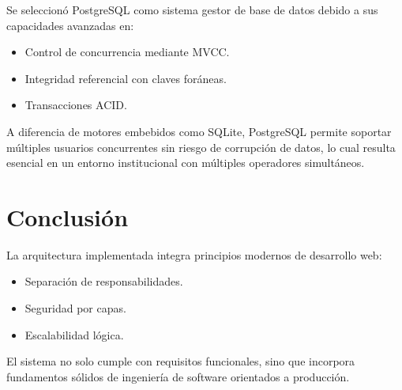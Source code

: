 \documentclass[12pt,letterpaper]{article}
\begin{document}
Se seleccionó PostgreSQL como sistema gestor de base de datos debido a sus capacidades avanzadas en:
\begin{itemize}
    \item Control de concurrencia mediante MVCC.
    \item Integridad referencial con claves foráneas.
    \item Transacciones ACID.
\end{itemize}

A diferencia de motores embebidos como SQLite, PostgreSQL permite soportar múltiples usuarios concurrentes sin riesgo de corrupción de datos, lo cual resulta esencial en un entorno institucional con múltiples operadores simultáneos.

\section{Conclusión}

La arquitectura implementada integra principios modernos de desarrollo web:
\begin{itemize}
    \item Separación de responsabilidades.
    \item Seguridad por capas.
    \item Escalabilidad lógica.
\end{itemize}

El sistema no solo cumple con requisitos funcionales, sino que incorpora fundamentos sólidos de ingeniería de software orientados a producción.
\end{document}
